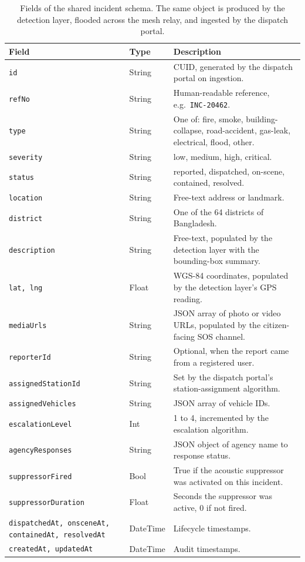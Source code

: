 \begin{table}[H]
\centering
\caption{Fields of the shared incident schema. The same object is produced by the detection layer, flooded across the mesh relay, and ingested by the dispatch portal.}
\label{tab:incident}
\small
\begin{tabularx}{\textwidth}{|l|l|X|}
\hline
\textbf{Field} & \textbf{Type} & \textbf{Description} \\
\hline
\texttt{id} & String & CUID, generated by the dispatch portal on ingestion. \\
\hline
\texttt{refNo} & String & Human-readable reference, e.g.\ \texttt{INC-20462}. \\
\hline
\texttt{type} & String & One of: fire, smoke, building-collapse, road-accident, gas-leak, electrical, flood, other. \\
\hline
\texttt{severity} & String & low, medium, high, critical. \\
\hline
\texttt{status} & String & reported, dispatched, on-scene, contained, resolved. \\
\hline
\texttt{location} & String & Free-text address or landmark. \\
\hline
\texttt{district} & String & One of the 64 districts of Bangladesh. \\
\hline
\texttt{description} & String & Free-text, populated by the detection layer with the bounding-box summary. \\
\hline
\texttt{lat, lng} & Float & WGS-84 coordinates, populated by the detection layer's GPS reading. \\
\hline
\texttt{mediaUrls} & String & JSON array of photo or video URLs, populated by the citizen-facing SOS channel. \\
\hline
\texttt{reporterId} & String & Optional, when the report came from a registered user. \\
\hline
\texttt{assignedStationId} & String & Set by the dispatch portal's station-assignment algorithm. \\
\hline
\texttt{assignedVehicles} & String & JSON array of vehicle IDs. \\
\hline
\texttt{escalationLevel} & Int & 1 to 4, incremented by the escalation algorithm. \\
\hline
\texttt{agencyResponses} & String & JSON object of agency name to response status. \\
\hline
\texttt{suppressorFired} & Bool & True if the acoustic suppressor was activated on this incident. \\
\hline
\texttt{suppressorDuration} & Float & Seconds the suppressor was active, 0 if not fired. \\
\hline
\texttt{dispatchedAt, onsceneAt, containedAt, resolvedAt} & DateTime & Lifecycle timestamps. \\
\hline
\texttt{createdAt, updatedAt} & DateTime & Audit timestamps. \\
\hline
\end{tabularx}
\end{table}


